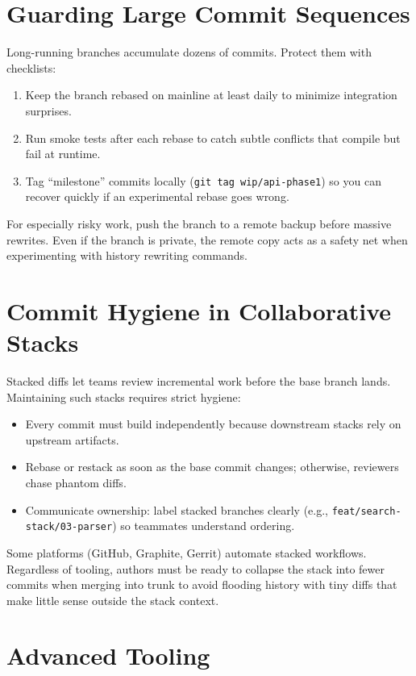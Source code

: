 \section{Guarding Large Commit Sequences}
Long-running branches accumulate dozens of commits. Protect them with checklists:

\begin{enumerate}
  \item Keep the branch rebased on mainline at least daily to minimize integration surprises.
  \item Run smoke tests after each rebase to catch subtle conflicts that compile but fail at runtime.
  \item Tag ``milestone'' commits locally (\texttt{git tag wip/api-phase1}) so you can recover quickly if an experimental rebase goes wrong.
\end{enumerate}

For especially risky work, push the branch to a remote backup before massive rewrites. Even if the branch is private, the remote copy acts as a safety net when experimenting with history rewriting commands.

\section{Commit Hygiene in Collaborative Stacks}
Stacked diffs let teams review incremental work before the base branch lands. Maintaining such stacks requires strict hygiene:

\begin{itemize}
  \item Every commit must build independently because downstream stacks rely on upstream artifacts.
  \item Rebase or restack as soon as the base commit changes; otherwise, reviewers chase phantom diffs.
  \item Communicate ownership: label stacked branches clearly (e.g., \texttt{feat/search-stack/03-parser}) so teammates understand ordering.
\end{itemize}

Some platforms (GitHub, Graphite, Gerrit) automate stacked workflows. Regardless of tooling, authors must be ready to collapse the stack into fewer commits when merging into trunk to avoid flooding history with tiny diffs that make little sense outside the stack context.

\section{Advanced Tooling}
